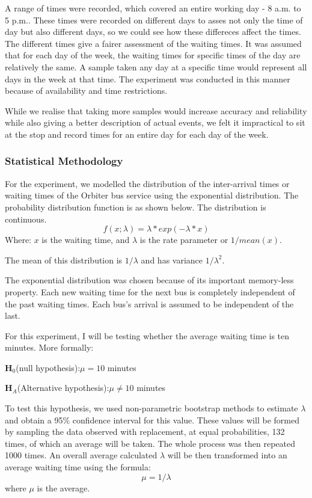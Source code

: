 A range of times were recorded, which covered an entire working day - 8 a.m. to 5 p.m.. These times were recorded on different days to asses not only the time of day but also different days, so we could see how these differeces affect the times. The different times give a fairer assessment of the waiting times. It was assumed that for each day of the week, the waiting times for specific times of the day are relatively the same. A sample taken any day at a specific time would represent all days in the week at that time. The experiment was conducted in this manner because of availability and time restrictions.

While we realise that taking more samples would increase accuracy and reliability while also giving a better description of actual events, we felt it impractical to sit at the stop and record times for an entire day for each day of the week.



\subsubsection*{Statistical Methodology}
For the experiment, we modelled the distribution of the inter-arrival times or waiting times of the Orbiter bus service using the exponential distribution. The probability distribution function is as shown below. The distribution is continuous. $$f(x;\lambda)=\lambda*exp(-\lambda*x)$$
Where: $x$ is the waiting time, and $\lambda$ is the rate parameter or $1/mean(x)$.

The mean of this distribution is $1/\lambda$ and has variance $1/\lambda^2$.

The exponential distribution was chosen because of its important memory-less property. Each new waiting time for the next bus is completely independent of the past waiting times. Each bus's arrival is assumed to be independent of the last.

For this experiment, I will be testing whether the average waiting time is ten minutes. More formally:

\noindent
$\mathbf H_0$(null hypothesis):$\mu=10$ minutes

\noindent
$\mathbf H_A$(Alternative hypothesis):$\mu\neq 10$ minutes


To test this hypothesis, we used non-parametric bootstrap methods to estimate $\lambda$ and obtain a 95\% confidence interval for this value. These values will be formed by sampling the data observed with replacement, at equal probabilities, 132 times, of which an average will be taken. The whole process was then repeated 1000 times. An overall average calculated $\lambda$ will be then transformed into an average waiting time using the formula:$$\mu=1/\lambda$$ where $\mu$ is the average.

